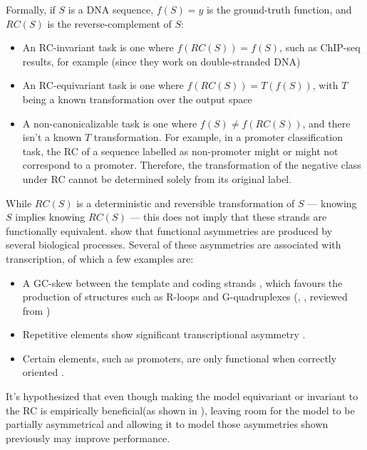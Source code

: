 \documentclass[   ]{article}
\begin{document}
Formally, if \(S\) is a DNA sequence, \(f(S)=y\) is the ground-truth
function, and \(RC(S)\) is the reverse-complement of \(S\):
\begin{itemize}
	\item An RC-invariant task is one where \(f(RC(S))=f(S)\), such as ChIP-seq results, for example (since they work on double-stranded DNA)
	\item An RC-equivariant task is one where \(f(RC(S))=T(f(S))\), with \(T\) being
	a known transformation over the output space
	\item A non-canonicalizable task is one where $f(S)\neq f(RC(S))$, and there isn't a known $T$ transformation. For example, in a promoter classification task, the RC of a sequence labelled as
	non-promoter might or might not correspond to a promoter. Therefore, the
	transformation of the negative class under RC cannot be determined
	solely from its original label.
\end{itemize}

While \(RC(S)\) is a deterministic and reversible transformation of
\(S\) --- knowing \(S\) implies knowing \(RC(S)\) --- this does not
imply that these strands are functionally equivalent. \citet{moeckelStrandAsymmetriesGenomic2023} show that functional asymmetries are produced by several biological
processes. Several of
these asymmetries are associated with transcription, of which a few examples are:
\begin{itemize}
	\item A GC-skew between the template and coding strands
	\citep{greenTranscriptionassociatedMutationalAsymmetry2003}, which
	favours the production of structures such as R-loops and G-quadruplexes
	(\citet{ginnoRloopFormationDistinctive2012},
	\citet{maoDNAGquadruplexStructures2018}, reviewed from \citet{moeckelStrandAsymmetriesGenomic2023})
	\item Repetitive elements show significant transcriptional asymmetry
	\citep{georgakopoulos-soaresAsymmetronToolkitIdentification2021}.
	\item Certain elements, such as promoters, are only functional when correctly
	oriented \citep{nagawaRelationshipTATASequence1985}.
\end{itemize}

It's hypothesized that even though making the model equivariant or invariant to the RC is empirically beneficial(as shown in \citet{zhouBetterUnderstandingReverseComplement2021}), leaving room for the model to be partially asymmetrical and allowing it to model those asymmetries shown previously may improve performance.
\end{document}
